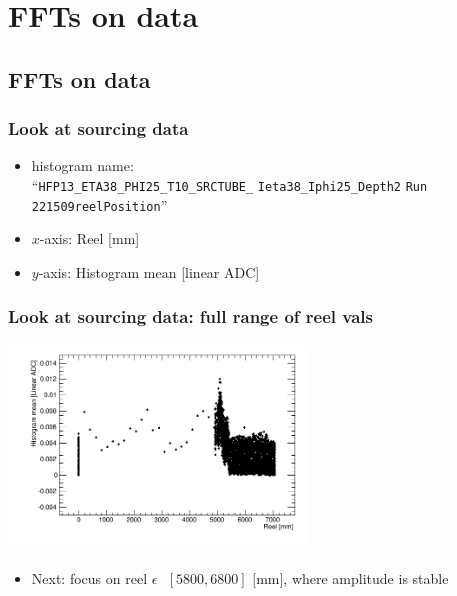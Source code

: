\documentclass[bigger]{beamer}
\begin{document}
\section{FFTs on data}
\label{sec-3}
\subsection{FFTs on data}
\label{sec-3-1}
\begin{frame}
\frametitle{Look at sourcing data}
\label{sec-3-1-1}
\begin{itemize}

\item histogram name:\\
\label{sec-3-1-1-1}%
``\texttt{HFP13\_ETA38\_PHI25\_T10\_SRCTUBE\_} \newline{}
\texttt{Ieta38\_Iphi25\_Depth2}  \newline{}
\texttt{Run 221509reelPosition}''

\item $x$-axis: Reel [mm]
\label{sec-3-1-1-2}%

\item $y$-axis: Histogram mean [linear ADC]
\label{sec-3-1-1-3}%
\end{itemize} %
\end{frame}
\begin{frame}
\frametitle{Look at sourcing data: full range of reel vals}
\label{sec-3-1-2}
\label{sec-3-1-2-1}

\centering
\includegraphics[width=0.6\textwidth]{fig/sourcing_unzoomed_plot.png}
\begin{itemize}

\item Next: focus on \(\text{reel } \epsilon \text{ } [5800, 6800] \text{ [mm]}\), where amplitude is stable
\label{sec-3-1-2-2}%
\end{itemize} %
\end{frame}
\end{document}
